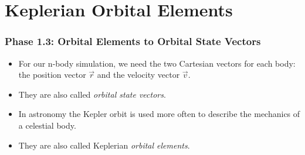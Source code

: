\section{Keplerian Orbital Elements}
\begin{frame}
    \frametitle{Phase 1.3: Orbital Elements to Orbital State Vectors}
    \begin{itemize}
        \item For our n-body simulation, we need the two Cartesian vectors for each body: the position vector $\vec{r}$ and the velocity vector $\vec{v}$. 
        \item They are also called \textit{orbital state vectors}.
        \vspace*{1em}
        \item In astronomy the Kepler orbit is used more often to describe the mechanics of a celestial body.
        \item They are also called Keplerian \textit{orbital elements}.
    \end{itemize}
    \pause
    \vfill
\end{frame}


